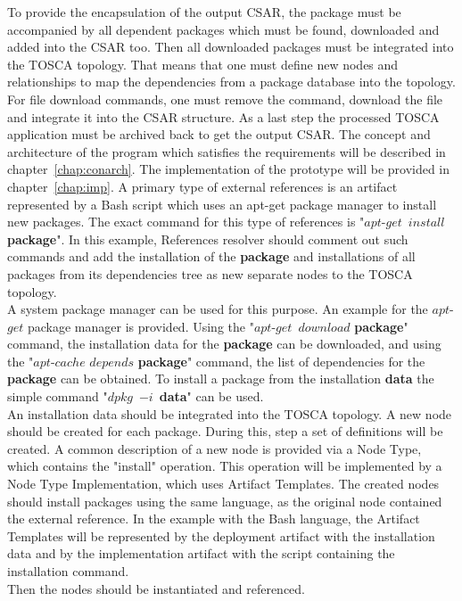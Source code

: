 To provide the encapsulation of the output CSAR, the package must be accompanied by all dependent packages which must be found, downloaded and added into the CSAR too.
Then all downloaded packages must be integrated into the TOSCA topology.
That means that one must define new nodes and relationships to map the dependencies from a package database into the topology.
For file download commands, one must remove the command, download the file and integrate it into the CSAR structure.
As a last step the processed TOSCA application must be archived back to get the output CSAR.
The concept and architecture of the program which satisfies the requirements will be described in chapter~\ref{chap:conarch}.
The implementation of the prototype will be provided in chapter~\ref{chap:imp}.
A primary type of external references is an artifact represented by a Bash script which uses an apt-get package manager to install new packages.
The exact command for this type of references is "$apt$-$get$~$install$ \textbf{package}".
In this example, References resolver should comment out such commands and add the installation of the \textbf{package} and installations of all packages from its dependencies tree as new separate nodes to the TOSCA topology. \\
A system package manager can be used for this purpose. 
An example for the $apt$-$get$ package manager is provided. 
Using the "$apt$-$get$~$download$ \textbf{package}" command, the installation data for the \textbf{package} can be downloaded, and using the "$apt$-$cache$ $depends$ \textbf{package}" command, the list of dependencies for the \textbf{package} can be obtained. 
To install a package from the installation \textbf{data} the simple command "$dpkg$~$-i$~\textbf{data}" can be used.\\
An installation data should be integrated into the TOSCA topology. 
A new node should be created for each package. 
During this, step a set of definitions will be created.
A common description of a new node is provided via a Node Type, which contains the "install" operation. 
This operation will be implemented by a Node Type Implementation, which uses Artifact Templates.
The created nodes should install packages using the same language, as the original node contained the external reference.
In the example with the Bash language, the Artifact Templates will be represented by the deployment artifact with the installation data and by the implementation artifact with the script containing the installation command. \\
Then the nodes should be instantiated and referenced.
